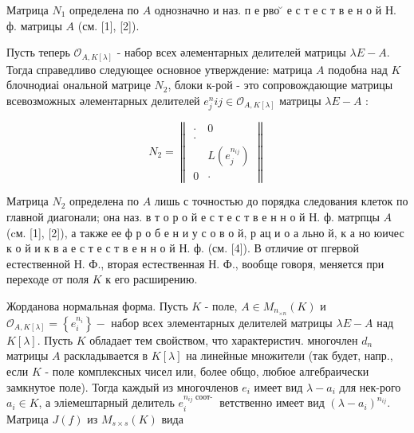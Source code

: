 \documentclass[10pt]{article}
\begin{document}
Матрица $N_{1}$ определена по $A$ однозначно и наз. п е рво ̆ е с т е с т в е н о й Н. ф. матрицы $A$ (см. [1], [2]).



Пусть теперь $\mathscr{O}_{A, K[\lambda]}$ - набор всех әлементарных делителей матрицы $\lambda E-A$. Тогда справедливо следующее основное утверждение: матрица $A$ подобна над $K$ блочнодиаі ональной матрице $N_{2}$, блоки к-рой - это сопровождающие матрицы всевозможных әлементарных делителей $e_{j}^{n} i j \in \mathscr{O}_{A, K[\lambda]}$ матрицы $\lambda E-A$ :



\[

N_{2}=\left\|\begin{array}{cc}

\cdot & 0 \\

\cdot & \\

& L\left(e_{j}^{n_{i j}}\right) \\

0 & \cdot

\end{array}\right\|

\]



Матрица $N_{2}$ определена по $A$ лишь с точностью до порядка следования клеток по главной диагонали; она наз. в т о р о й е с т е с т в е н н о й Н. ф. матрпцы $A$ (cм. [1], [2]), а также ее ф р о б е н и у с о в о й, р ац и о а льно й, к а но юичес к о й и к в а е с т е с т в е н н о й Н. ф. (см. [4]). В отличие от пгервой естественной Н. Ф., вторая естественная Н. Ф., вообще говоря, меняется при переходе от поля $K$ к его расширению.



Жорданова нормальная форма. Пусть $K$ - поле, $A \in M_{n_{\times n}}(K)$ и $\mathcal{O}_{A, K[\lambda]}=\left\{e_{i}^{n_{i}}\right\}-$ набор всех элементарных делителей матрицы $\lambda E-A$ над $K[\lambda]$. Пусть $K$ обладает тем свойством, что характеристич. многочлен $d_{n}$ матрицы $A$ раскладывается в $K[\lambda]$ на линейные множители (так будет, напр., если $K$ - поле комплексных чисел или, более общо, любюе алгебраически замкнутое поле). Тогда каждый из многочленов $e_{i}$ имеет вид $\lambda-a_{i}$ для нек-рого $a_{i} \in K$, а эліемештарный делитель $e_{i}^{n_{i j} \text { соот- }}$ ветственно имеет вид $\left(\lambda-a_{i}\right)^{n_{i j}}$. Матрица $J(f)$ из $M_{s \times s}(K)$ вида
\end{document}
